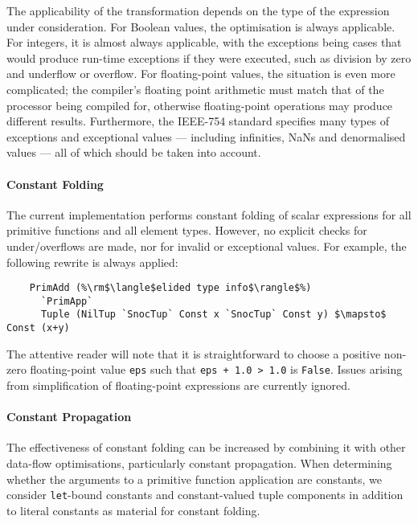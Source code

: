 The applicability of the transformation depends on the type of the expression
under consideration. For Boolean values, the optimisation is always applicable.
For integers, it is almost always applicable, with the exceptions being cases
that would produce run-time exceptions if they were executed, such as division
by zero and underflow or overflow. For floating-point values, the situation is
even more complicated; the compiler's floating point arithmetic must match that
of the processor being compiled for, otherwise floating-point operations may
produce different results. Furthermore, the IEEE-754 standard specifies many
types of exceptions and exceptional values --- including infinities, NaNs and
denormalised values --- all of which should be taken into account.


\paragraph{Constant Folding}

The current implementation performs constant folding of scalar expressions for
all primitive functions and all element types. However, no explicit checks for
under/overflows are made, nor for invalid or exceptional values. For example,
the following rewrite is always applied:
%
%
\begin{lstlisting}[style=Haskell,numbers=none,mathescape]
%\bf$\langle$ constant folding $\rangle$%
    PrimAdd (%\rm$\langle$elided type info$\rangle$%)
      `PrimApp`
      Tuple (NilTup `SnocTup` Const x `SnocTup` Const y) $\mapsto$ Const (x+y)
\end{lstlisting}
%
The attentive reader will note that it is straightforward to choose a positive
non-zero floating-point value \texttt{eps} such that \lstinline{eps + 1.0 > 1.0}
is \texttt{False}. Issues arising from simplification of floating-point
expressions are currently ignored.



\paragraph{Constant Propagation}

The effectiveness of constant folding can be increased by combining it with
other data-flow optimisations, particularly constant propagation. When
determining whether the arguments to a primitive function application are
constants, we consider \texttt{let}-bound constants and constant-valued tuple
components in addition to literal constants as material for constant folding.


